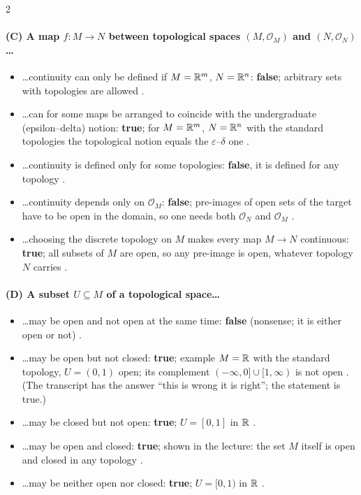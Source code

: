 \begin{paracol}{2}
\paragraph{(C) A map $f\colon M\to N$ between topological spaces $(M,\mathcal O_M)$ and $(N,\mathcal O_N)$\dots}
\begin{itemize}
  \item \dots continuity can only be defined if $M=\mathbb{R}^m$, $N=\mathbb{R}^n$: \textbf{false}; arbitrary sets with topologies are allowed .
  \item \dots can for some maps be arranged to coincide with the undergraduate (epsilon--delta) notion: \textbf{true}; for $M=\mathbb{R}^m$, $N=\mathbb{R}^n$ with the standard topologies the topological notion
        equals the $\varepsilon$--$\delta$ one .
  \item \dots continuity is defined only for some topologies: \textbf{false}, it is defined for any topology .
  \item \dots continuity depends only on $\mathcal O_M$: \textbf{false}; pre-images of open sets of the target have to be open in the domain, so one needs both $\mathcal O_N$ and $\mathcal O_M$
        .
  \item \dots choosing the discrete topology on $M$ makes every map $M\to N$ continuous: \textbf{true}; all subsets of $M$ are open, so any pre-image is open, whatever topology $N$ carries
        .
\end{itemize}

\paragraph{(D) A subset $U\subseteq M$ of a topological space\dots}
\begin{itemize}
  \item \dots may be open and not open at the same time: \textbf{false} (nonsense; it is either open or not) .
  \item \dots may be open but not closed: \textbf{true}; example $M=\mathbb{R}$ with the standard topology, $U=(0,1)$ open; its complement $(-\infty,0]\cup[1,\infty)$ is not open
        . (The transcript has the answer ``this is wrong it is right''; the statement is true.)
  \item \dots may be closed but not open: \textbf{true}; $U=[0,1]$ in $\mathbb{R}$ .
  \item \dots may be open and closed: \textbf{true}; shown in the lecture: the set $M$ itself is open and closed in any topology .
  \item \dots may be neither open nor closed: \textbf{true}; $U=[0,1)$ in $\mathbb{R}$ .
\end{itemize}


\end{paracol}
